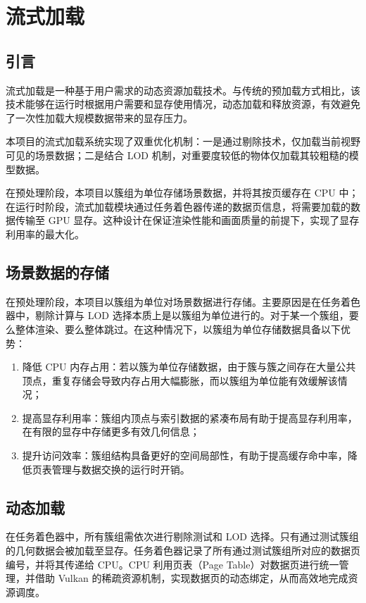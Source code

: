 \section{流式加载} \label{sec:streaming}

\subsection{引言}

流式加载是一种基于用户需求的动态资源加载技术。与传统的预加载方式相比，该技术能够在运行时根据用户需要和显存使用情况，动态加载和释放资源，有效避免了一次性加载大规模数据带来的显存压力\cite{sahm2004}。

本项目的流式加载系统实现了双重优化机制：一是通过剔除技术，仅加载当前视野可见的场景数据\cite{CohenOr2003}；二是结合 LOD 机制，对重要度较低的物体仅加载其较粗糙的模型数据。

在预处理阶段，本项目以簇组为单位存储场景数据，并将其按页缓存在 CPU 中；在运行时阶段，流式加载模块通过任务着色器传递的数据页信息，将需要加载的数据传输至 GPU 显存。这种设计在保证渲染性能和画面质量的前提下，实现了显存利用率的最大化。

\subsection{场景数据的存储}

在预处理阶段，本项目以簇组为单位对场景数据进行存储。主要原因是在任务着色器中，剔除计算与 LOD 选择本质上是以簇组为单位进行的。对于某一个簇组，要么整体渲染、要么整体跳过。在这种情况下，以簇组为单位存储数据具备以下优势：

\begin{enumerate}
    \item 降低 CPU 内存占用：若以簇为单位存储数据，由于簇与簇之间存在大量公共顶点，重复存储会导致内存占用大幅膨胀，而以簇组为单位能有效缓解该情况；
    \item 提高显存利用率：簇组内顶点与索引数据的紧凑布局有助于提高显存利用率，在有限的显存中存储更多有效几何信息；
    \item 提升访问效率：簇组结构具备更好的空间局部性\cite{MCCOOL2012}，有助于提高缓存命中率，降低页表管理与数据交换的运行时开销。
\end{enumerate}

\subsection{动态加载}

在任务着色器中，所有簇组需依次进行剔除测试和 LOD 选择。只有通过测试簇组的几何数据会被加载至显存。任务着色器记录了所有通过测试簇组所对应的数据页编号，并将其传递给 CPU。CPU 利用页表（Page Table）对数据页进行统一管理，并借助 Vulkan 的稀疏资源机制，实现数据页的动态绑定，从而高效地完成资源调度。

